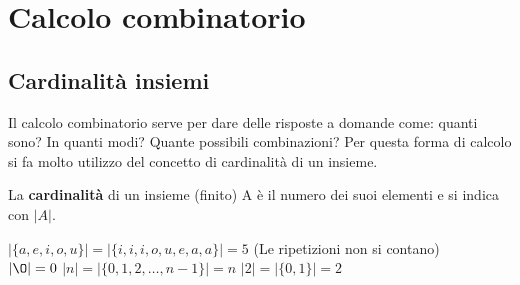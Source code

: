 \newpage
\section{Calcolo combinatorio}

\subsection{Cardinalità insiemi}
Il calcolo combinatorio serve per dare delle risposte a domande come: quanti sono? In quanti modi? Quante possibili combinazioni?
Per questa forma di calcolo si fa molto utilizzo del concetto di cardinalità di un insieme.

\begin{definition}[Cardinalità]
La \textbf{cardinalità} di un insieme (finito) A è il numero dei suoi elementi e si indica con $\lvert A\rvert$.
\end{definition}

\begin{example}
$\lvert \{a,e,i,o,u\}\rvert = \lvert\{i,i,i,o,u,e,a,a\}\rvert = 5$ (Le ripetizioni non si contano)\\
$\lvert \O \rvert = 0$ \hspace{.7cm} $\lvert n\rvert = \lvert\{0,1,2,\ldots,n-1\}\rvert = n$ \hspace{.7cm} $\lvert 2\rvert = \lvert\{0,1\}\rvert = 2$
\end{example}

